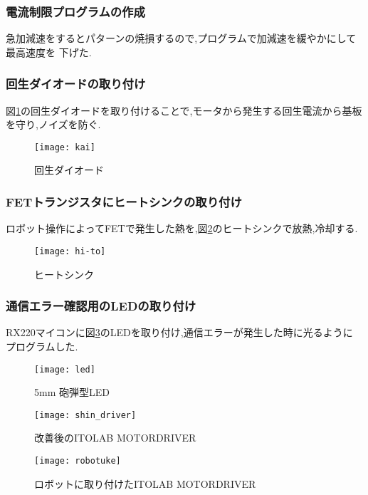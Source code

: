 \subsubsection{電流制限プログラムの作成}
急加減速をするとパターンの焼損するので,プログラムで加減速を緩やかにして最高速度を
下げた.
\subsubsection{回生ダイオードの取り付け}
図\ref{fig:kai}の回生ダイオードを取り付けることで,モータから発生する回生電流から基板
を守り,ノイズを防ぐ.
\begin{figure}[H]
  \begin{center}
    \texttt{[image: kai]}
    \end{center}
  \caption{回生ダイオード}
 \label{fig:kai}
\end{figure}
\subsubsection{FETトランジスタにヒートシンクの取り付け}
ロボット操作によってFETで発生した熱を,図\ref{fig:hi-to}のヒートシンクで放熱,冷却する.
\begin{figure}[H]
  \begin{center}
    \texttt{[image: hi-to]}
    \end{center}
  \caption{ヒートシンク}
 \label{fig:hi-to}
\end{figure}
\subsubsection{通信エラー確認用のLEDの取り付け}
RX220マイコンに図\ref{fig:led}のLEDを取り付け,通信エラーが発生した時に光るように
プログラムした.
\begin{figure}[H]
  \begin{center}
    \texttt{[image: led]}
    \end{center}
  \caption{5mm 砲弾型LED}
 \label{fig:led}
\end{figure}
\begin{figure}[H]
  \begin{center}
    \texttt{[image: shin\_driver]}
    \end{center}
  \caption{改善後のITOLAB MOTORDRIVER}
 \label{fig:shin_driver}
\end{figure}
\begin{figure}[H]
  \begin{center}
    \texttt{[image: robotuke]}
    \end{center}
  \caption{ロボットに取り付けたITOLAB MOTORDRIVER}
 \label{fig:robotuke}
\end{figure}

